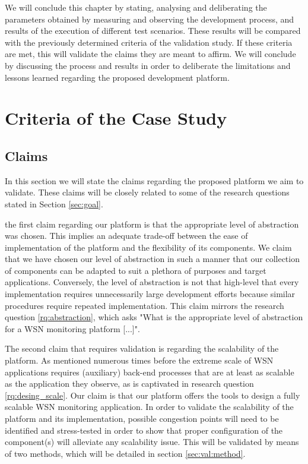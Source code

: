 We will conclude this chapter by stating, analysing and deliberating the parameters obtained by measuring and observing the development process, and results of the execution of different test scenarios. These results will be compared with the previously determined criteria of the validation study. If these criteria are met, this will validate the claims they are meant to affirm. We will conclude by discussing the process and results in order to deliberate the limitations and lessons learned regarding the proposed development platform.
	
\section{Criteria of the Case Study}
\subsection{Claims}
In this section we will state the claims regarding the proposed platform we aim to validate. These claims will be closely related to some of the research questions stated in Section \ref{sec:goal}.

the first claim regarding our platform is that the appropriate level of abstraction was chosen. This implies an adequate trade-off between the ease of implementation of the platform and the flexibility of its components. We claim that we have chosen our level of abstraction in such a manner that our collection of components can be adapted to suit a plethora of purposes and target applications. Conversely, the level of abstraction is not that high-level that every implementation requires unnecessarily large development efforts because similar procedures require repeated implementation. This claim mirrors the research question \ref{rq:abstraction}, which asks "What is the appropriate level of abstraction for a WSN monitoring platform [...]". 

The second claim that requires validation is regarding the scalability of the platform. As mentioned numerous times before the extreme scale of WSN applications requires (auxiliary) back-end processes that are at least as scalable as the application they observe, as is captivated in research question \ref{rq:desing_scale}. Our claim is that our platform offers the tools to design a fully scalable WSN monitoring application. In order to validate the scalability of the platform and its implementation, possible congestion points will need to be identified and stress-tested in order to show that proper configuration of the component(s) will alleviate any scalability issue. This will be validated by means of two methods, which will be detailed in section \ref{sec:val:method}.


